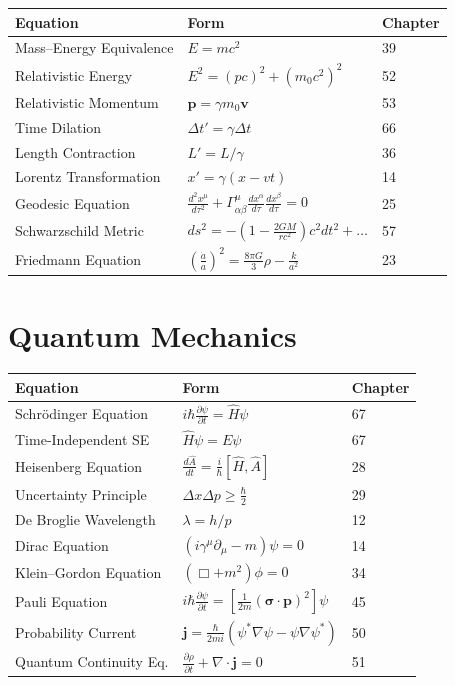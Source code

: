 \begin{center}
\begin{tabular}{lll}
\hline
\textbf{Equation} & \textbf{Form} & \textbf{Chapter} \\
\hline
Mass--Energy Equivalence & $E = mc^2$ & 39 \\
Relativistic Energy & $E^2 = (pc)^2 + (m_0c^2)^2$ & 52 \\
Relativistic Momentum & $\mathbf{p} = \gamma m_0 \mathbf{v}$ & 53 \\
Time Dilation & $\Delta t' = \gamma \Delta t$ & 66 \\
Length Contraction & $L' = L/\gamma$ & 36 \\
Lorentz Transformation & $x' = \gamma(x - vt)$ & 14 \\
Geodesic Equation & $\frac{d^2x^\mu}{d\tau^2} + \Gamma^\mu_{\alpha\beta}\frac{dx^\alpha}{d\tau}\frac{dx^\beta}{d\tau} = 0$ & 25 \\
Schwarzschild Metric & $ds^2 = -\left(1-\frac{2GM}{rc^2}\right)c^2dt^2 + \ldots$ & 57 \\
Friedmann Equation & $\left(\frac{\dot{a}}{a}\right)^2 = \frac{8\pi G}{3}\rho - \frac{k}{a^2}$ & 23 \\
\hline
\end{tabular}
\end{center}

\section*{Quantum Mechanics}

\begin{center}
\begin{tabular}{lll}
\hline
\textbf{Equation} & \textbf{Form} & \textbf{Chapter} \\
\hline
Schr\"odinger Equation & $i\hbar\frac{\partial\psi}{\partial t} = \hat{H}\psi$ & 67 \\
Time-Independent SE & $\hat{H}\psi = E\psi$ & 67 \\
Heisenberg Equation & $\frac{d\hat{A}}{dt} = \frac{i}{\hbar}[\hat{H}, \hat{A}]$ & 28 \\
Uncertainty Principle & $\Delta x \Delta p \geq \frac{\hbar}{2}$ & 29 \\
De Broglie Wavelength & $\lambda = h/p$ & 12 \\
Dirac Equation & $(i\gamma^\mu\partial_\mu - m)\psi = 0$ & 14 \\
Klein--Gordon Equation & $(\Box + m^2)\phi = 0$ & 34 \\
Pauli Equation & $i\hbar\frac{\partial\psi}{\partial t} = \left[\frac{1}{2m}(\boldsymbol{\sigma}\cdot\mathbf{p})^2\right]\psi$ & 45 \\
Probability Current & $\mathbf{j} = \frac{\hbar}{2mi}(\psi^*\nabla\psi - \psi\nabla\psi^*)$ & 50 \\
Quantum Continuity Eq. & $\frac{\partial\rho}{\partial t} + \nabla\cdot\mathbf{j} = 0$ & 51 \\
\hline
\end{tabular}
\end{center}


